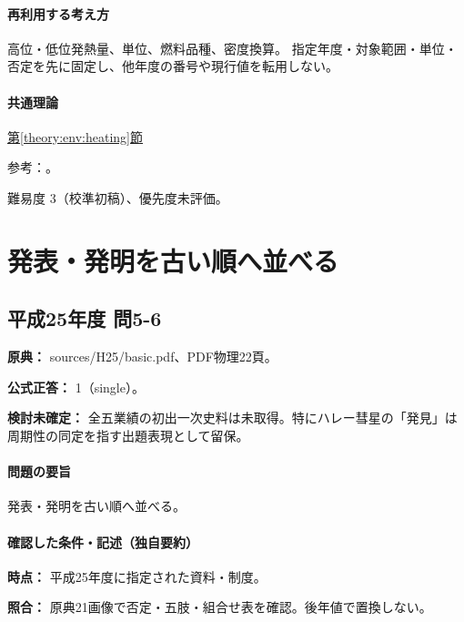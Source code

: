 \paragraph{再利用する考え方} 高位・低位発熱量、単位、燃料品種、密度換算。 指定年度・対象範囲・単位・否定を先に固定し、他年度の番号や現行値を転用しない。

\paragraph{共通理論} \hyperref[theory:env:heating]{第\ref*{theory:env:heating}節}

\par 参考：\cite{env58_heating}。

\par 難易度 3（校準初稿）、優先度未評価。

\section{発表・発明を古い順へ並べる}

\subsection{平成25年度 問5-6}
\label{q:h25-reg-basic-5-6}

\noindent\textbf{原典：} sources/H25/basic.pdf、PDF物理22頁。

\textbf{公式正答：} 1（single）。

\par\textbf{検討未確定：} 全五業績の初出一次史料は未取得。特にハレー彗星の「発見」は周期性の同定を指す出題表現として留保。

\paragraph{問題の要旨} 発表・発明を古い順へ並べる。

\paragraph{確認した条件・記述（独自要約）}\mbox{}\par

\noindent\textbf{時点：} 平成25年度に指定された資料・制度。\par

\noindent\textbf{照合：} 原典21画像で否定・五肢・組合せ表を確認。後年値で置換しない。\par

